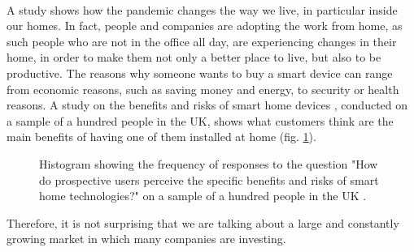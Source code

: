 \\ A study \cite{s21113838} shows how the pandemic changes the way we live, in particular inside our homes. In fact, people and companies are adopting the work from home, as such people who are not in the office all day, are experiencing changes in their home, in order to make them not only a better place to live, but also to be productive. The reasons why someone wants to buy a smart device can range from economic reasons, such as saving money and energy, to security or health reasons. A study on the benefits and risks of smart home devices \cite{wilson2017benefits}, conducted on a sample of a hundred people in the UK, shows what customers think are the main benefits of having one of them installed at home (fig. \ref{graph:smart-reas}). 
\begin{figure}[ht]
    \centering
{}
\caption{Histogram showing the frequency of responses to the question "How do prospective users perceive the specific benefits and risks of smart home technologies?" on a sample of a hundred people in the UK \cite{wilson2017benefits}.  }
\label{graph:smart-reas}
\end{figure}
Therefore, it is not surprising that we are talking about a large and constantly growing market in which many companies are investing. 
